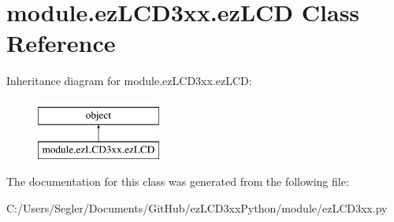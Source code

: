 \hypertarget{classmodule_1_1ez_l_c_d3xx_1_1ez_l_c_d}{\section{module.\-ez\-L\-C\-D3xx.\-ez\-L\-C\-D Class Reference}
\label{d0/dec/classmodule_1_1ez_l_c_d3xx_1_1ez_l_c_d}
}
Inheritance diagram for module.\-ez\-L\-C\-D3xx.\-ez\-L\-C\-D\-:\begin{figure}[H]
\begin{center}
\leavevmode
\includegraphics[height=2.000000cm]{d0/dec/classmodule_1_1ez_l_c_d3xx_1_1ez_l_c_d}
\end{center}
\end{figure}


The documentation for this class was generated from the following file\-:\begin{DoxyCompactItemize}
\item 
C\-:/\-Users/\-Segler/\-Documents/\-Git\-Hub/ez\-L\-C\-D3xx\-Python/module/ez\-L\-C\-D3xx.\-py\end{DoxyCompactItemize}
